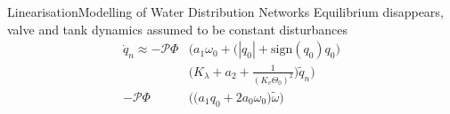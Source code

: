 \begin{frame}{Linearisation}{Modelling of Water Distribution Networks}
	Equilibrium disappears, valve and tank dynamics assumed to be constant disturbances 
	\begin{equation}\label{eq:SymbolicLinearisationSimplified}
		\begin{split}
			\dot{q}_n \approx -\mathcal{P}\Phi &\Bigg(a_1\omega_0 + \Big(|q_0|+\text{sign}(q_0)q_0\Big) \\
			&\Bigg(K_\lambda + a_2 + \frac{1}{(K_v \Theta_0)^2}\Bigg) \tilde{q}_n \Bigg) \\
			- \mathcal{P}\Phi&\Bigg(\Big(a_1 q_0 + 2a_0\omega_0\Big) \tilde{\omega}\Bigg)
		\end{split}
	\end{equation}
	
\end{frame}
